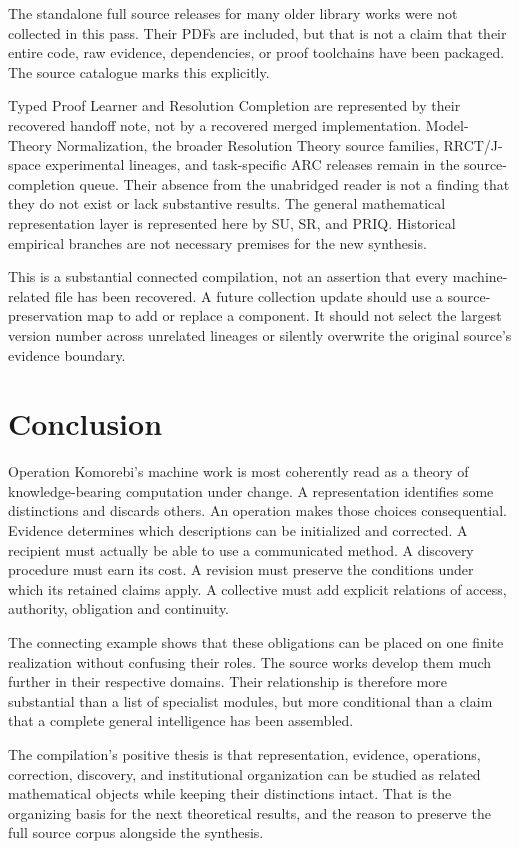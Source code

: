 \documentclass[11pt,oneside]{article}
\begin{document}
The standalone full source releases for many older library works were not collected in this pass. Their PDFs are included, but that is not a claim that their entire code, raw evidence, dependencies, or proof toolchains have been packaged. The source catalogue marks this explicitly.

Typed Proof Learner and Resolution Completion are represented by their recovered handoff note, not by a recovered merged implementation. Model-Theory Normalization, the broader Resolution Theory source families, RRCT/J-space experimental lineages, and task-specific ARC releases remain in the source-completion queue. Their absence from the unabridged reader is not a finding that they do not exist or lack substantive results. The general mathematical representation layer is represented here by SU, SR, and PRIQ. Historical empirical branches are not necessary premises for the new synthesis.

This is a substantial connected compilation, not an assertion that every machine-related file has been recovered. A future collection update should use a source-preservation map to add or replace a component. It should not select the largest version number across unrelated lineages or silently overwrite the original source's evidence boundary.

\section{Conclusion}
Operation Komorebi's machine work is most coherently read as a theory of knowledge-bearing computation under change. A representation identifies some distinctions and discards others. An operation makes those choices consequential. Evidence determines which descriptions can be initialized and corrected. A recipient must actually be able to use a communicated method. A discovery procedure must earn its cost. A revision must preserve the conditions under which its retained claims apply. A collective must add explicit relations of access, authority, obligation and continuity.

The connecting example shows that these obligations can be placed on one finite realization without confusing their roles. The source works develop them much further in their respective domains. Their relationship is therefore more substantial than a list of specialist modules, but more conditional than a claim that a complete general intelligence has been assembled.

The compilation's positive thesis is that representation, evidence, operations, correction, discovery, and institutional organization can be studied as related mathematical objects while keeping their distinctions intact. That is the organizing basis for the next theoretical results, and the reason to preserve the full source corpus alongside the synthesis.
\end{document}
